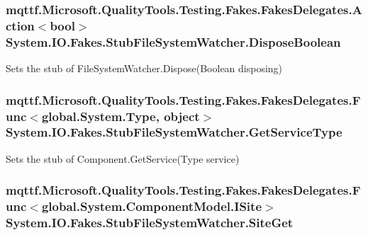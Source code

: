 \hypertarget{class_system_1_1_i_o_1_1_fakes_1_1_stub_file_system_watcher_a82c6c4fb31b663dac782b74e65919e61}{
\subsubsection[{Dispose\-Boolean}]{\setlength{\rightskip}{0pt plus 5cm}mqttf.\-Microsoft.\-Quality\-Tools.\-Testing.\-Fakes.\-Fakes\-Delegates.\-Action$<$bool$>$ System.\-I\-O.\-Fakes.\-Stub\-File\-System\-Watcher.\-Dispose\-Boolean}}\label{class_system_1_1_i_o_1_1_fakes_1_1_stub_file_system_watcher_a82c6c4fb31b663dac782b74e65919e61}


Sets the stub of File\-System\-Watcher.\-Dispose(\-Boolean disposing)

\hypertarget{class_system_1_1_i_o_1_1_fakes_1_1_stub_file_system_watcher_ab190ccbfddf3c73782128ade7ec6b4db}{
\subsubsection[{Get\-Service\-Type}]{\setlength{\rightskip}{0pt plus 5cm}mqttf.\-Microsoft.\-Quality\-Tools.\-Testing.\-Fakes.\-Fakes\-Delegates.\-Func$<$global.\-System.\-Type, object$>$ System.\-I\-O.\-Fakes.\-Stub\-File\-System\-Watcher.\-Get\-Service\-Type}}\label{class_system_1_1_i_o_1_1_fakes_1_1_stub_file_system_watcher_ab190ccbfddf3c73782128ade7ec6b4db}


Sets the stub of Component.\-Get\-Service(\-Type service)

\hypertarget{class_system_1_1_i_o_1_1_fakes_1_1_stub_file_system_watcher_a2666a54edbb28773c828bb968f48c209}{
\subsubsection[{Site\-Get}]{\setlength{\rightskip}{0pt plus 5cm}mqttf.\-Microsoft.\-Quality\-Tools.\-Testing.\-Fakes.\-Fakes\-Delegates.\-Func$<$global.\-System.\-Component\-Model.\-I\-Site$>$ System.\-I\-O.\-Fakes.\-Stub\-File\-System\-Watcher.\-Site\-Get}}\label{class_system_1_1_i_o_1_1_fakes_1_1_stub_file_system_watcher_a2666a54edbb28773c828bb968f48c209}


